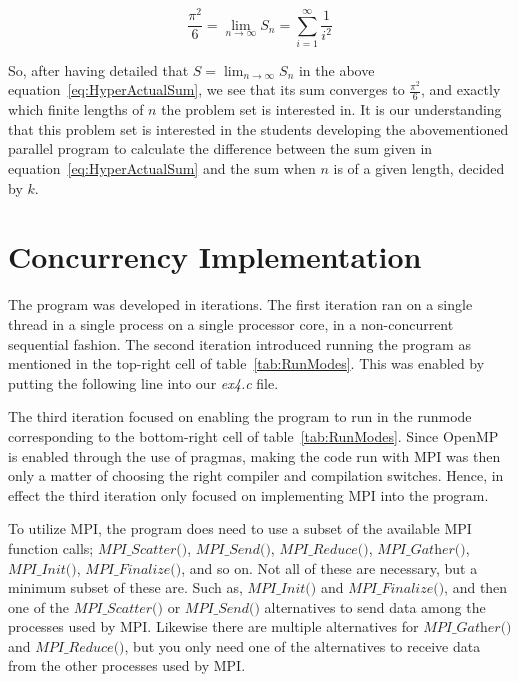 \documentclass[fontsize=11pt,paper=a4,titlepage]{report}
\begin{document}
\begin{equation}
	\frac{\pi^2}{6} = \lim_{n \to \infty}S_n = \sum_{i=1}^{\infty} \frac{1}{i^2}
	\label{eq:HyperActualSum}
\end{equation}

So, after having detailed that $S = \lim_{n \to \infty}S_n$ in the above
equation~\ref{eq:HyperActualSum}, we see that its sum converges to $\frac{
\pi^2}{6}$, and exactly which finite lengths of $n$ the problem set is
interested in. It is our understanding that this problem set is interested in
the students developing the abovementioned parallel program to calculate the
difference between the sum given in equation~\ref{eq:HyperActualSum} and the sum
when $n$ is of a given length, decided by $k$.

\section{Concurrency Implementation}

The program was developed in iterations. The first iteration ran on a single
thread in a single process on a single processor core, in a non-concurrent
sequential fashion. The second iteration introduced running the program as
mentioned in the top-right cell of table~\ref{tab:RunModes}. This was enabled by
putting the following line into our \textit{ex4.c} file.



The third iteration focused on enabling the program to run in the runmode
corresponding to the bottom-right cell of table~\ref{tab:RunModes}.
Since OpenMP is enabled through the use of pragmas, making the code run with MPI
was then only a matter of choosing the right compiler and compilation switches.
Hence, in effect the third iteration only focused on implementing MPI into the
program.

To utilize MPI, the program does need to use a subset of the available MPI
function calls; $\textit{MPI\_Scatter()}$, $\textit{MPI\_Send()}$,
$\textit{MPI\_Reduce()}$, $\textit{MPI\_Gather()}$, $\textit{MPI\_Init()}$,
$\textit{MPI\_Finalize()}$, and so on. Not all of these are necessary, but a
minimum subset of these are. Such as, $\textit{MPI\_Init()}$ and $\textit{
MPI\_Finalize()}$, and then one of the $\textit{MPI\_Scatter()}$ or
$\textit{MPI\_Send()}$ alternatives to send data among the processes used by
MPI. Likewise there are multiple alternatives for $\textit{MPI\_Gather()}$ and
$\textit{MPI\_Reduce()}$, but you only need one of the alternatives to receive
data from the other processes used by MPI.
\end{document}
